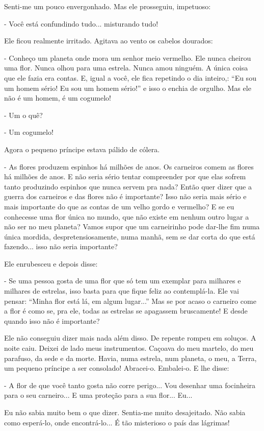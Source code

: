 Senti-me um pouco envergonhado. Mas ele prosseguiu, impetuoso:

- Você está confundindo tudo... misturando tudo!

Ele ficou realmente irritado. Agitava ao vento os cabelos dourados:

- Conheço um planeta onde mora um senhor meio vermelho. Ele nunca
cheirou uma flor. Nunca olhou para uma estrela. Nunca amou ninguém. A
única coisa que ele fazia era contas. E, igual a você, ele fica
repetindo o dia inteiro,: ``Eu sou um homem sério! Eu sou um homem
sério!'' e isso o enchia de orgulho. Mas ele não é um homem, é um
cogumelo!

- Um o quê?

- Um cogumelo!

Agora o pequeno príncipe estava pálido de cólera.

- As flores produzem espinhos há milhões de anos. Os carneiros comem as
flores há milhões de anos. E não seria sério tentar compreender por que
elas sofrem tanto produzindo espinhos que nunca servem pra nada? Então
quer dizer que a guerra dos carneiros e das flores não é importante?
Isso não seria mais sério e mais importante do que as contas de um velho
gordo e vermelho? E se eu conhecesse uma flor única no mundo, que não
existe em nenhum outro lugar a não ser no meu planeta? Vamos supor que
um carneirinho pode dar-lhe fim numa única mordida, despretensiosamente,
numa manhã, sem se dar corta do que está fazendo... isso não seria
importante?

Ele enrubesceu e depois disse:

- Se uma pessoa gosta de uma flor que só tem um exemplar para milhares e
milhares de estrelas, isso basta para que fique feliz ao contemplá-la.
Ele vai pensar: ``Minha flor está lá, em algum lugar...'' Mas se por
acaso o carneiro come a flor é como se, pra ele, todas as estrelas se
apagassem bruscamente! E desde quando isso não é importante?

Ele não conseguiu dizer mais nada além disso. De repente rompeu em
soluços. A noite caiu. Deixei de lado meus instrumentos. Caçoava do meu
martelo, do meu parafuso, da sede e da morte. Havia, numa estrela, num
planeta, o meu, a Terra, um pequeno príncipe a ser consolado! Abracei-o.
Embalei-o. E lhe disse:

- A flor de que você tanto gosta não corre perigo... Vou desenhar uma
focinheira para o seu carneiro... E uma proteção para a sua flor...
Eu...

Eu não sabia muito bem o que dizer. Sentia-me muito desajeitado. Não
sabia como esperá-lo, onde encontrá-lo... É tão misterioso o país das
lágrimas!

